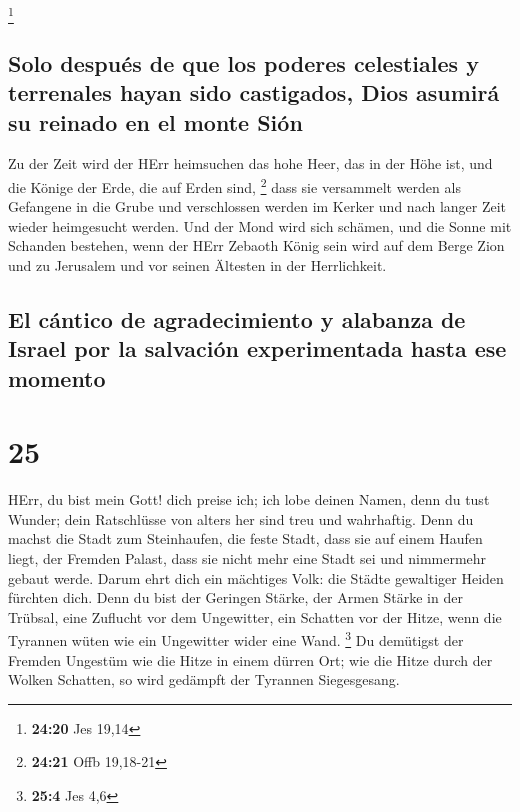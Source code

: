 \footnote{\textbf{24:20} Jes 19,14}

\hypertarget{solo-despuuxe9s-de-que-los-poderes-celestiales-y-terrenales-hayan-sido-castigados-dios-asumiruxe1-su-reinado-en-el-monte-siuxf3n}{%
\subsection{Solo después de que los poderes celestiales y terrenales
hayan sido castigados, Dios asumirá su reinado en el monte
Sión}\label{solo-despuuxe9s-de-que-los-poderes-celestiales-y-terrenales-hayan-sido-castigados-dios-asumiruxe1-su-reinado-en-el-monte-siuxf3n}}

 Zu der Zeit wird der HErr heimsuchen das hohe Heer, das
in der Höhe ist, und die Könige der Erde, die auf Erden sind,
\footnote{\textbf{24:21} Offb 19,18-21}  dass sie
versammelt werden als Gefangene in die Grube und verschlossen werden im
Kerker und nach langer Zeit wieder heimgesucht werden. 
Und der Mond wird sich schämen, und die Sonne mit Schanden bestehen,
wenn der HErr Zebaoth König sein wird auf dem Berge Zion und zu
Jerusalem und vor seinen Ältesten in der Herrlichkeit.

\hypertarget{el-cuxe1ntico-de-agradecimiento-y-alabanza-de-israel-por-la-salvaciuxf3n-experimentada-hasta-ese-momento}{%
\subsection{El cántico de agradecimiento y alabanza de Israel por la
salvación experimentada hasta ese
momento}\label{el-cuxe1ntico-de-agradecimiento-y-alabanza-de-israel-por-la-salvaciuxf3n-experimentada-hasta-ese-momento}}

\hypertarget{section-24}{%
\section{25}\label{section-24}}

 HErr, du bist mein Gott! dich preise ich; ich lobe deinen
Namen, denn du tust Wunder; dein Ratschlüsse von alters her sind treu
und wahrhaftig.  Denn du machst die Stadt zum Steinhaufen,
die feste Stadt, dass sie auf einem Haufen liegt, der Fremden Palast,
dass sie nicht mehr eine Stadt sei und nimmermehr gebaut werde.
 Darum ehrt dich ein mächtiges Volk: die Städte gewaltiger
Heiden fürchten dich.  Denn du bist der Geringen Stärke,
der Armen Stärke in der Trübsal, eine Zuflucht vor dem Ungewitter, ein
Schatten vor der Hitze, wenn die Tyrannen wüten wie ein Ungewitter wider
eine Wand. \footnote{\textbf{25:4} Jes 4,6}  Du demütigst
der Fremden Ungestüm wie die Hitze in einem dürren Ort; wie die Hitze
durch der Wolken Schatten, so wird gedämpft der Tyrannen Siegesgesang.

